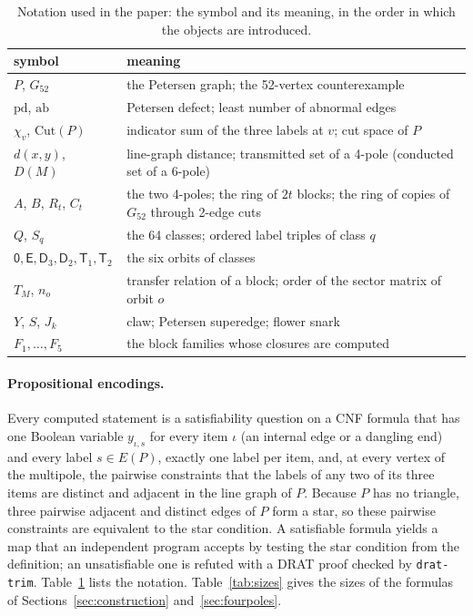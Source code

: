 \documentclass[11pt]{article}
\theoremstyle{definition}
\theoremstyle{remark}
\newcommand{\PG}{P}
\newcommand{\pd}{\mathrm{pd}}
\newcommand{\ab}{\mathrm{ab}}
\newcommand{\Gfty}{G_{52}}
\newcommand{\Cut}{\mathrm{Cut}}
\newcommand{\Oz}{\mathsf{0}}
\newcommand{\OEc}{\mathsf{E}}
\newcommand{\ODthree}{\mathsf{D}_3}
\newcommand{\ODtwo}{\mathsf{D}_2}
\newcommand{\OTone}{\mathsf{T}_1}
\newcommand{\OTtwo}{\mathsf{T}_2}
\begin{document}
\begin{table}[t]\centering\small
\begin{tabular}{>{\raggedright\arraybackslash}p{5.2cm}>{\raggedright\arraybackslash}p{9cm}}
\toprule
symbol & meaning \\
\midrule
$\PG$, $\Gfty$ & the Petersen graph; the 52-vertex counterexample \\
$\pd$, $\ab$ & Petersen defect; least number of abnormal edges \\
$\chi_v$, $\Cut(\PG)$ & indicator sum of the three labels at $v$; cut space of $\PG$ \\
$d(x,y)$, $D(M)$ & line-graph distance; transmitted set of a 4-pole (conducted set of a 6-pole) \\
$A$, $B$, $R_t$, $C_t$ & the two 4-poles; the ring of $2t$ blocks; the ring of copies of $\Gfty$ through 2-edge cuts \\
$Q$, $S_q$ & the 64 classes; ordered label triples of class $q$ \\
$\Oz,\OEc,\ODthree,\ODtwo,\OTone,\OTtwo$ & the six orbits of classes \\
$T_M$, $n_o$ & transfer relation of a block; order of the sector matrix of orbit $o$ \\
$Y$, $S$, $J_k$ & claw; Petersen superedge; flower snark \\
$F_1,\dots,F_5$ & the block families whose closures are computed \\
\bottomrule
\end{tabular}
\caption{Notation used in the paper: the symbol and its meaning, in the order in which the objects are introduced.}\label{tab:notation}
\end{table}

\paragraph{Propositional encodings.} Every computed statement is a satisfiability question on a CNF
formula that has one Boolean variable $y_{\iota,s}$ for every item $\iota$ (an internal edge or a
dangling end) and every label $s \in E(\PG)$, exactly one label per item, and, at every vertex of the
multipole, the pairwise constraints that the labels of any two of its three items are distinct and
adjacent in the line graph of $\PG$. Because $\PG$ has no triangle, three pairwise adjacent and
distinct edges of $\PG$ form a star, so these pairwise constraints are equivalent to the star
condition. A satisfiable formula yields a map that an independent program accepts by testing the
star condition from the definition; an unsatisfiable one is refuted with a DRAT proof checked by
\texttt{drat-trim}. Table~\ref{tab:notation} lists the notation. Table~\ref{tab:sizes} gives the sizes of the formulas of
Sections~\ref{sec:construction} and~\ref{sec:fourpoles}.
\end{document}
